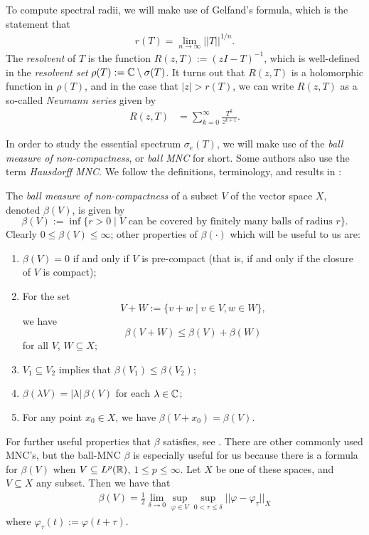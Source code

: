 To compute spectral radii, we will make use of Gelfand's formula, which is the statement that
\begin{align}
	r(T) = \lim_{n \to \infty} ||T||^{1/n}. \label{eqn:gelfand}
\end{align}
The \emph{resolvent} of $T$ is the function $R(z, T):= (zI - T)^{-1}$, which is well-defined in the \emph{resolvent set} $\rho(T):= \mathbb{C} \setminus \sigma(T)$. It turns out that $R(z, T)$ is a holomorphic function in $\rho(T)$, and in the case that $|z| > r(T)$, we can write $R(z, T)$ as a so-called \emph{Neumann series} given by
\begin{align}
	R(z, T) &= \sum_{k = 0}^\infty \frac{T^k}{z^{k+1}}. \label{eqn:neumannseries}
\end{align}	

In order to study the essential spectrum $\sigma_e(T)$, we will make use of the \emph{ball measure of non-compactness}, or \emph{ball MNC} for short. Some authors also use the term \emph{Hausdorff MNC}. We follow the definitions, terminology, and results in \cite{Akhmerov1992}:

\begin{definition} \label{th:betadef}
	The \emph{ball measure of non-compactness} of a subset $V$ of the vector space $X$, denoted $\beta(V)$, is given by
	\[\beta(V):= \inf\{ r>0 \mid V \text{ can be covered by finitely many balls of radius } r \}.\]
	Clearly $0 \leq \beta(V) \leq \infty$; other properties of $\beta(\cdot)$ which will be useful to us are:
	\begin{enumerate}
		\item $\beta(V) = 0$ if and only if $V$ is pre-compact (that is, if and only if the closure of $V$ is compact);
		\item For the set
		\[V + W := \{v + w \mid v \in V, w \in W\},\]
		we have
		\[\beta(V+W) \leq \beta(V) + \beta(W)\]
		for all $V$, $W \subseteq X$;
		\item $V_1 \subseteq V_2$ implies that $\beta(V_1) \leq \beta(V_2)$;
		\item $\beta(\lambda V) = |\lambda| \, \beta(V)$ for each $\lambda \in \mathbb{C}$;
		\item For any point $x_0 \in X$, we have $\beta(V+x_0) = \beta(V)$.
	\end{enumerate}
\end{definition}
For further useful properties that $\beta$ satisfies, see \cite{Akhmerov1992}. There are other commonly used MNC's, but the ball-MNC $\beta$ is especially useful for us because there is a formula for $\beta(V)$ when  $V \subseteq L^p(\mathbb{R})$, $1 \leq p \leq \infty$. Let $X$ be one of these spaces, and $V \subseteq X$ any subset. Then we have that
\begin{align}
	\beta(V) = \frac 12 \lim_{\delta \to 0} \sup_{\varphi \in V} \sup_{0<\tau \leq \delta} ||\varphi - \varphi_\tau||_X \label{eqn:betaformula}
\end{align}
where $\varphi_\tau(t) := \varphi(t + \tau)$.

